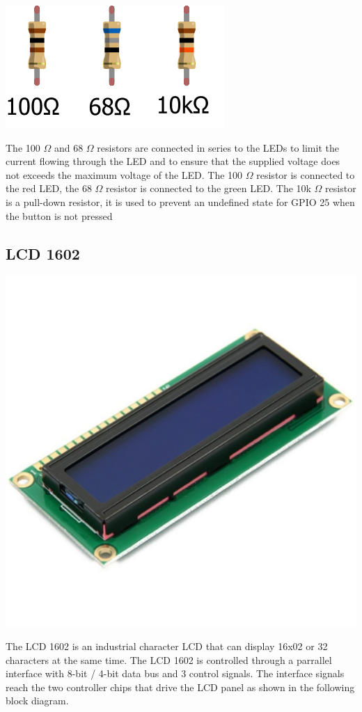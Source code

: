 \documentclass[]{article}
\begin{document}
\begin{center}
    \includegraphics{resistors}
\end{center}
The 100 $ \Omega $ and 68 $ \Omega $ resistors are connected in series to the LEDs to limit the current flowing through the LED and to ensure that the supplied 
voltage does not exceeds the maximum voltage of the LED. The 100 $ \Omega $ resistor is connected to the red LED, the 68 $ \Omega $ 
resistor is connected to the green LED.
The 10k $ \Omega $ resistor is a pull-down resistor, it is used to prevent an undefined state for GPIO 25 when the button is not pressed 

\subsection{LCD 1602}

\begin{center}
    \includegraphics[scale=0.2]{lcd}
\end{center}
The LCD 1602 is an industrial character LCD that can display 16x02 or 32 characters at the same time. 
The LCD 1602 is controlled through a parrallel interface with 8-bit / 4-bit data bus and 3 control signals. 
The interface signals reach the two controller chips that drive the LCD panel as shown in the following block diagram.
\end{document}
